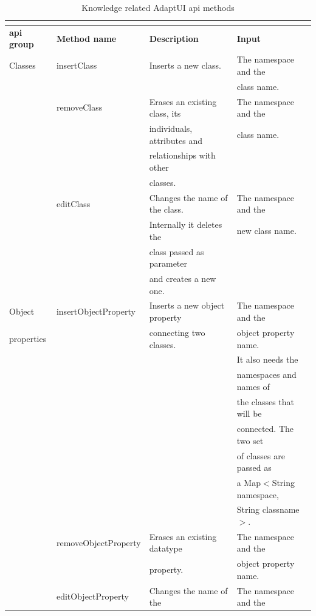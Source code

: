 \begin{center}
\footnotesize

\begin{longtable}{l l l l}
  \caption{Knowledge related AdaptUI \ac{api} methods}\\
  \label{tbl:api_knowledge} \\
  \hline 
  \textbf{\ac{api} group} 	& \textbf{Method name} 	& \textbf{Description} 		& \textbf{Input}\\
  \hline
  Classes		& insertClass		& Inserts a new class.		& The namespace and the \\
			& 			& 				& class name.		\\
			& removeClass		& Erases an existing class, its	& The namespace and the \\
			& 			& individuals, attributes and	& class name.		\\
			& 			& relationships with other 	& 			\\
			& 			& classes.			& 			\\
			& editClass		& Changes the name of the class.& The namespace and the \\
			&			& Internally it deletes the 	& new class name.	\\
			&			& class passed as parameter 	&			\\
			&			& and creates a new one.	&			\\
\hline 
  Object 		& insertObjectProperty	& Inserts a new object property	& The namespace and the	\\
  properties		&			& connecting two classes.	&  object property name.\\
			&			&				& It also needs the 	\\
			& 			& 				& namespaces and names of 	\\
			&			&				& the classes that will be 	\\
			& 			& 				& connected. The two set 	\\ 
			&			&				& of classes are passed as 	\\
			& 			& 				& a Map$<$String namespace,	\\
			& 			& 				& String classname$>$.	\\
			& removeObjectProperty	& Erases an existing datatype	& The namespace and the \\
			& 			& property.			& object property name.	\\
			& editObjectProperty	& Changes the name of the 	& The namespace and the \\

\end{longtable}
\end{center}
